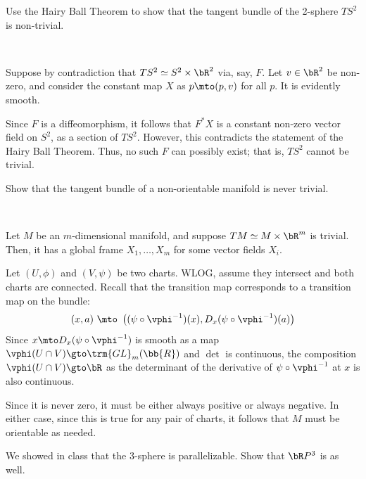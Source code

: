 \documentclass[14pt]{extarticle}
\begin{document}
\nq
\begin{qu}[num=9.3a]
	Use the Hairy Ball Theorem to show that the tangent bundle of the 2-sphere
	$TS^{2}$ is non-trivial.
\end{qu} \

\begin{soln}
	Suppose by contradiction that $TS^{2}\simeq S^{2}\times\bR^{2}$ via, say, $F$.
	Let $v\in\bR^{2}$ be non-zero, and consider the constant map
	$X$ as $p\mto(p,v)$ for all $p$.
	It is evidently smooth.

	Since $F$ is a diffeomorphism, it follows that $F^{*}X$ is a constant
	non-zero vector field on $S^{2}$, as a section of $TS^{2}$.
	However, this contradicts the statement of the Hairy Ball Theorem.
	Thus, no such $F$ can possibly exist; that is, $TS^{2}$ cannot be trivial.
\end{soln}


\nq
\begin{qu}[num=9.7]
	Show that the tangent bundle of a non-orientable manifold is never trivial.
\end{qu} \

\begin{soln}
	Let $M$ be an $m$-dimensional manifold, and suppose
	$TM\simeq M\times\bR^{m}$ is trivial.
	Then, it has a global frame $X_{1},\dots,X_{m}$ for some vector fields $X_{i}$.

	Let $(U,\phi)$ and $(V,\psi)$ be two charts.
	WLOG, assume they intersect and both charts are connected.
	Recall that the transition map corresponds to a transition map on the
	bundle:
	\begin{equation*}
		(x,a) \ \mto \ \left((\psi\circ\vphi^{-1})(x),D_{x}(\psi\circ\vphi^{-1})(a)\right)
	\end{equation*}
	Since $x\mto D_{x}(\psi\circ\vphi^{-1})$ is smooth as a map
	$\vphi(U\cap V)\gto\trm{GL}_{m}(\bb{R})$ and $\det$ is continuous,
	the composition $\vphi(U\cap V)\gto\bR$ as the determinant of
	the derivative of $\psi\circ\vphi^{-1}$ at $x$ is also continuous.

	Since it is never zero, it must be either always positive or always negative.
	In either case, since this is true for any pair of charts, it follows that
	$M$ must be orientable as needed.
\end{soln}


\nq
\begin{qu}[num=??]
	We showed in class that the 3-sphere is parallelizable.
	Show that $\bR P^{3}$ is as well.
\end{qu} \
\end{document}
